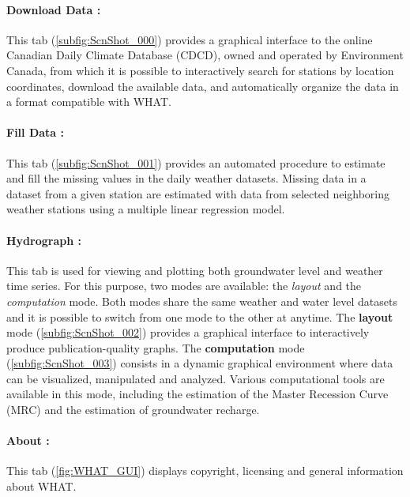 \documentclass[WHATMANUAL.tex]{subfiles}
\begin{document}

\paragraph{Download Data :} This tab (\cref{subfig:ScnShot_000}) provides a graphical interface to the online Canadian Daily Climate Database (CDCD), owned and operated by Environment Canada, from which it is possible to interactively search for stations by location coordinates, download the available data, and automatically organize the data in a format compatible with WHAT.

\paragraph{Fill Data :} This tab (\cref{subfig:ScnShot_001}) provides an automated procedure to estimate and fill the missing values in the daily weather datasets. Missing data in a dataset from a given station are estimated with data from selected neighboring weather stations using a multiple linear regression model.

\paragraph{Hydrograph :} This tab is used for viewing and plotting both groundwater level and weather time series. For this purpose, two modes are available: the \emph{layout} and the \emph{computation} mode. Both modes share the same weather and water level datasets and it is possible to switch from one mode to the other at anytime. The \textbf{layout} mode (\cref{subfig:ScnShot_002}) provides a graphical interface to interactively produce publication-quality graphs. The \textbf{computation} mode (\cref{subfig:ScnShot_003}) consists in a dynamic graphical environment where data can be visualized, manipulated and analyzed. Various computational tools are available in this mode, including the estimation of the Master Recession Curve (MRC) and the estimation of groundwater recharge.

\paragraph{About :} This tab (\cref{fig:WHAT_GUI}) displays copyright, licensing and general information about WHAT.
\end{document}
